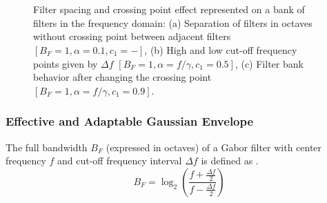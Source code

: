 \documentclass[journal]{IEEEtran}
\begin{document}
\begin{figure}[!ht]
\centering
     \\
    \\
\caption{Filter spacing and crossing point effect represented on a bank of filters in the frequency domain: (a) Separation of filters in octaves without crossing point between adjacent filters $[B_F=1, \alpha=0.1, c_1=-]$, (b) High and low cut-off frequency points given by $\Delta f$ $[B_F=1, \alpha=f/\gamma, c_1=0.5]$, (c) Filter bank behavior after changing the crossing point $[B_F=1, \alpha=f/\gamma, c_1=0.9]$.}\label{fig:1d_filterbank_spacing}
\end{figure}


\subsubsection{Effective and Adaptable Gaussian Envelope}
The full bandwidth $B_F$ (expressed in octaves) of a Gabor filter with center frequency $f$ and cut-off frequency interval $\Delta f$ is defined as \cite{Daugman:JOSA:1985}.
\begin{equation}\label{eq:frequency_bandwidth_interval}
    B_F = \log_2 \left( \frac{f + \frac{\Delta f}{2} }{f - \frac{\Delta f}{2}} \right)
\end{equation}
\end{document}
